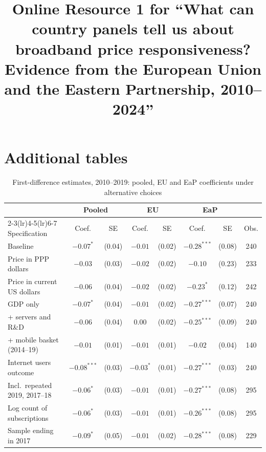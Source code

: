 \documentclass[pdflatex,sn-basic]{sn-jnl}
\begin{document}
\title{Online Resource 1 for ``What can country panels tell us about broadband price responsiveness? Evidence from the European Union and the Eastern Partnership, 2010--2024''}
\maketitle
\section*{Additional tables}
\begin{table}[h]
\caption{First-difference estimates, 2010--2019: pooled, EU and EaP coefficients under alternative choices}\label{tab:S1}
\footnotesize\setlength{\tabcolsep}{4pt}
\begin{tabular*}{\textwidth}{@{\extracolsep{\fill}}lccccccc@{}}
\toprule
& \multicolumn{2}{c}{Pooled} & \multicolumn{2}{c}{EU} & \multicolumn{2}{c}{EaP} & \\
\cmidrule(lr){2-3}\cmidrule(lr){4-5}\cmidrule(lr){6-7}
Specification & Coef. & SE & Coef. & SE & Coef. & SE & Obs.\\
\midrule
Baseline & $-0.07^{*}$ & (0.04) & $-0.01$ & (0.02) & $-0.28^{***}$ & (0.08) & 240\\
Price in PPP dollars & $-0.03$ & (0.03) & $-0.02$ & (0.02) & $-0.10$ & (0.23) & 233\\
Price in current US dollars & $-0.06$ & (0.04) & $-0.02$ & (0.02) & $-0.23^{*}$ & (0.12) & 242\\
GDP only & $-0.07^{*}$ & (0.04) & $-0.01$ & (0.02) & $-0.27^{***}$ & (0.07) & 240\\
+ servers and R\&D & $-0.06$ & (0.04) & $0.00$ & (0.02) & $-0.25^{***}$ & (0.09) & 240\\
+ mobile basket (2014--19) & $-0.01$ & (0.01) & $-0.01$ & (0.01) & $-0.02$ & (0.04) & 140\\
Internet users outcome & $-0.08^{***}$ & (0.03) & $-0.03^{*}$ & (0.01) & $-0.27^{***}$ & (0.03) & 240\\
Incl.\ repeated 2019, 2017--18 & $-0.06^{*}$ & (0.03) & $-0.01$ & (0.01) & $-0.27^{***}$ & (0.08) & 295\\
Log count of subscriptions & $-0.06^{*}$ & (0.03) & $-0.01$ & (0.01) & $-0.26^{***}$ & (0.08) & 295\\
Sample ending in 2017 & $-0.09^{*}$ & (0.05) & $-0.01$ & (0.02) & $-0.28^{***}$ & (0.08) & 229\\

\end{tabular*}
\end{table}
\end{document}
